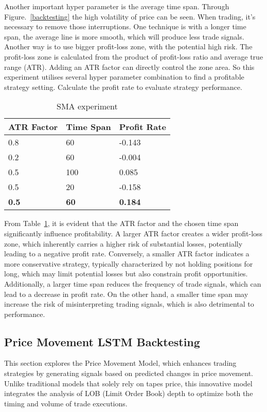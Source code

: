\documentclass[conference]{IEEEtran}
\begin{document}
Another important hyper parameter is the average time span. Through Figure.~\ref{backtesting} the high volatility of price can be seen. When trading, it's necessary to remove those interruptions. One technique is with a longer time span, the average line is more smooth, which will produce less trade signals. Another way is to use bigger profit-loss zone, with the potential high risk. The profit-loss zone is calculated from the product of profit-loss ratio and average true range (ATR). Adding an ATR factor can directly control the zone area. So this experiment utilises several hyper parameter combination to find a profitable strategy setting. Calculate the profit rate to evaluate strategy performance.

\begin{table}[tb]
\caption{SMA experiment}
\begin{center}
\begin{tabular}{|p{}|p{}|p{}|}
\hline
\textbf{ATR Factor} & \textbf{Time Span} & \textbf{Profit Rate} \\
\hline
 0.8 & 60 &  -0.143\\
\hline
 0.2 & 60 &  -0.004\\
\hline
 0.5 & 100 &  0.085\\
\hline
 0.5 & 20 &  -0.158\\
\hline
 \textbf{0.5} & \textbf{60} &  \textbf{0.184}\\
\hline
\end{tabular}
\label{SMA}
\end{center}
\end{table}


From Table~\ref{SMA}, it is evident that the ATR factor and the chosen time span significantly influence profitability. A larger ATR factor creates a wider profit-loss zone, which inherently carries a higher risk of substantial losses, potentially leading to a negative profit rate. Conversely, a smaller ATR factor indicates a more conservative strategy, typically characterized by not holding positions for long, which may limit potential losses but also constrain profit opportunities. Additionally, a larger time span reduces the frequency of trade signals, which can lead to a decrease in profit rate. On the other hand, a smaller time span may increase the risk of misinterpreting trading signals, which is also detrimental to performance.

\subsection{Price Movement LSTM Backtesting}
This section explores the Price Movement Model, which enhances trading strategies by generating signals based on predicted changes in price movement. Unlike traditional models that solely rely on tapes price, this innovative model integrates the analysis of LOB (Limit Order Book) depth to optimize both the timing and volume of trade executions.
\end{document}
